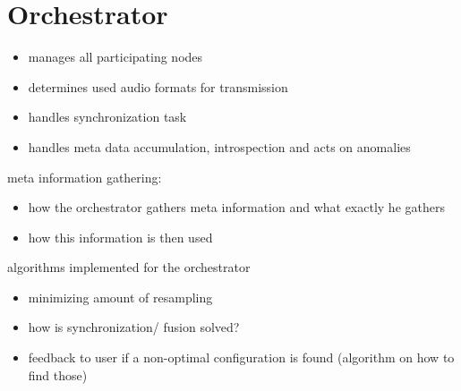 


\chapter{Orchestrator}

\begin{itemize}
	\item manages all participating nodes
	\item determines used audio formats for transmission
	\item handles synchronization task
	\item handles meta data accumulation, introspection and acts on anomalies
\end{itemize}

meta information gathering:

\begin{itemize}
	\item how the orchestrator gathers meta information and what exactly he gathers
	\item how this information is then used
\end{itemize}

algorithms implemented for the orchestrator

\begin{itemize}
	\item minimizing amount of resampling
	\item how is synchronization/ fusion solved?
	\item feedback to user if a non-optimal configuration is found (algorithm on how to find those)
\end{itemize}